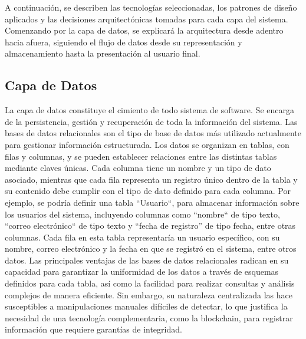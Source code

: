 A continuación, se describen las tecnologías seleccionadas, los patrones de diseño aplicados y las decisiones arquitectónicas tomadas para cada capa del sistema. Comenzando por la capa de datos, se explicará la arquitectura desde adentro hacia afuera, siguiendo el flujo de datos desde su representación y almacenamiento hasta la presentación al usuario final.

\subsection{Capa de Datos}

La capa de datos constituye el cimiento de todo sistema de software. Se encarga de la persistencia, gestión y recuperación de toda la información del sistema. Las bases de datos relacionales son el tipo de base de datos más utilizado actualmente para gestionar información estructurada. Los datos se organizan en tablas, con filas y columnas, y se pueden establecer relaciones entre las distintas tablas mediante claves únicas. Cada columna tiene un nombre y un tipo de dato asociado, mientras que cada fila representa un registro único dentro de la tabla y su contenido debe cumplir con el tipo de dato definido para cada columna. Por ejemplo, se podría definir una tabla ``Usuario``, para almacenar información sobre los usuarios del sistema, incluyendo columnas como ``nombre`` de tipo texto, ``correo electrónico`` de tipo texto y ``fecha de registro'' de tipo fecha, entre otras columnas. Cada fila en esta tabla representaría un usuario específico, con su nombre, correo electrónico y la fecha en que se registró en el sistema, entre otros datos. Las principales ventajas de las bases de datos relacionales radican en su capacidad para garantizar la uniformidad de los datos a través de esquemas definidos para cada tabla, así como la facilidad para realizar consultas y análisis complejos de manera eficiente. Sin embargo, su naturaleza centralizada las hace susceptibles a manipulaciones manuales difíciles de detectar, lo que justifica la necesidad de una tecnología complementaria, como la blockchain, para registrar información que requiere garantías de integridad.

